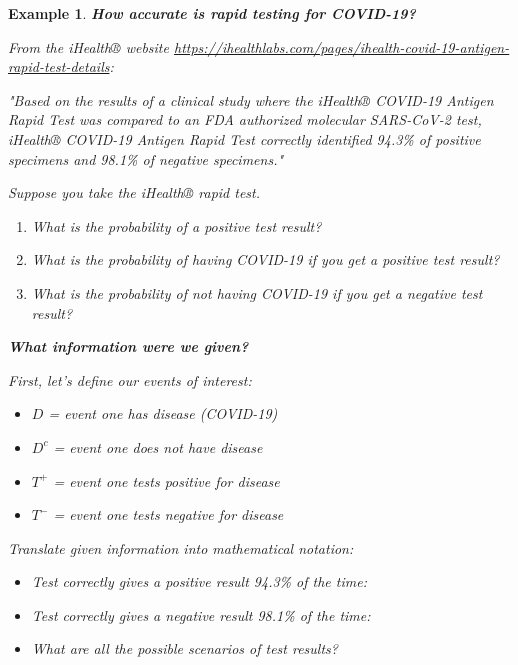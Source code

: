 \documentclass[12pt]{amsart}
\newtheorem{example}[theorem]{Example}
\begin{document}
\begin{example}  {\large \textbf{How accurate is rapid testing for COVID-19?} }

{\large From the iHealth® website  \newline}
{\tiny\url{https://ihealthlabs.com/pages/ihealth-covid-19-antigen-rapid-test-details}}: \newline
{\large "Based on the results of a clinical study where the iHealth® COVID-19 Antigen Rapid Test was compared to an FDA authorized molecular SARS-CoV-2 test, iHealth® COVID-19 Antigen Rapid Test correctly identified 94.3\% of positive specimens and 98.1\% of negative specimens."  \newline




Suppose you take the iHealth® rapid test. 
\begin{enumerate}
	\item What is the probability of a positive test result?
	\item What is the probability of having COVID-19 if you get a positive test result?
	\item What is the probability of not having COVID-19 if you get a negative test result?

\end{enumerate}
\vspace{0.5cm}
\textbf{What information were we given?}%

First, let's define our events of interest: 
\begin{itemize}
	\item $D$ = event one has disease (COVID-19)
	\item $D^c$ = event one does not have disease
	\item $T^+$ = event one tests positive for disease
	\item $T^-$ = event one tests negative for disease
\end{itemize}
\vspace{0.5cm}
Translate given information into mathematical notation:
\begin{itemize}
	\item Test correctly gives a positive result 94.3\% of the time:\newline
\vspace{1cm}
	\item Test correctly gives a negative result 98.1\% of the time: \newline 
\vspace{1cm}
	\item What are all the possible scenarios of test results?


\end{itemize}}
\end{example}
\end{document}
